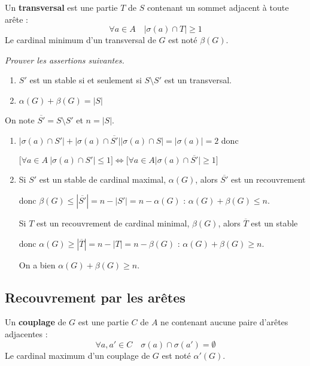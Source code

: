 Un {\bf transversal} est une partie $T$ de $S$ contenant un sommet adjacent à toute arête :
\[\forall a\in A\quad |\sigma(a)\cap T| \ge 1\]
Le cardinal minimum d'un transversal de $G$ est noté $\beta(G)$.
\begin{Exercise}[title=Une première dualité]\it
Prouver les assertions suivantes.

\begin{enumerate}
\item $S'$ est un stable si et seulement si $S\setminus S'$ est un transversal.
\item $\alpha(G)+\beta(G)=|S|$
\end{enumerate}
\end{Exercise}
\begin{Answer}
On note $\overline{S'} = S\setminus S'$ et $n = |S|$.
\begin{enumerate}
\item $\bigl|\sigma(a)\cap S'\bigr|+\bigl|\sigma(a)\cap \overline{S'}\bigr|
\bigl|\sigma(a)\cap S\bigr| = \bigl|\sigma(a)\bigr|=2$ donc

$\big[\forall a\in A\ \bigl|\sigma(a)\cap S'\bigr|\le 1 \bigr] \iff 
\bigr[\forall a\in A\bigl|\sigma(a)\cap \overline{S'}\bigr|\ge 1\bigr]$

\item Si $S'$ est un stable de cardinal maximal, $\alpha(G)$, alors $\overline{S'}$ est un recouvrement 

donc  $\beta(G) \le |\overline{S'}| = n - |S'|= n - \alpha(G)$ : $\alpha(G)+\beta(G) \le n$.

Si $T$ est un recouvrement de cardinal minimal, $\beta(G)$, alors $\overline T$ est un stable 

donc  $\alpha(G) \ge |\overline T| = n - |T| = n - \beta(G)$ : $\alpha(G)+\beta(G) \ge n$.

On a bien $\alpha(G)+\beta(G) \ge n$.
\end{enumerate}
\end{Answer}
\subsection{Recouvrement par les arêtes}
Un {\bf couplage} de $G$ est une partie $C$ de $A$ ne contenant aucune paire d'arêtes adjacentes : 
\[\forall a,a'\in C\quad \sigma(a)\cap \sigma(a')=\emptyset\]
Le cardinal maximum d'un couplage de $G$ est noté $\alpha'(G)$.

